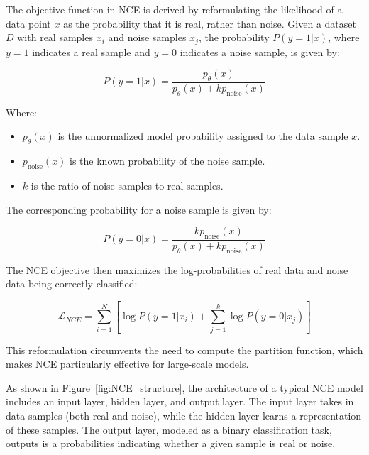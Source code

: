 The objective function in NCE is derived by reformulating the likelihood of a data point \( x \) as the probability that it is real, rather than noise. Given a dataset \( D \) with real samples \( x_i \) and noise samples \( x_j \), the probability \( P(y = 1 | x) \), where \( y = 1 \) indicates a real sample and \( y = 0 \) indicates a noise sample, is given by:

\begin{equation}
P(y = 1 | x) = \frac{p_{\theta}(x)}{p_{\theta}(x) + k p_{\text{noise}}(x)}
\end{equation}

Where:
\begin{itemize}
    \item \( p_{\theta}(x) \) is the unnormalized model probability assigned to the data sample \( x \).
    \item \( p_{\text{noise}}(x) \) is the known probability of the noise sample.
    \item \( k \) is the ratio of noise samples to real samples.
\end{itemize}

The corresponding probability for a noise sample is given by:

\begin{equation}
P(y = 0 | x) = \frac{k p_{\text{noise}}(x)}{p_{\theta}(x) + k p_{\text{noise}}(x)}
\end{equation}

The NCE objective then maximizes the log-probabilities of real data and noise data being correctly classified:

\begin{equation}
\mathcal{L}_{NCE} = \sum_{i=1}^{N} \left[ \log P(y=1 | x_i) + \sum_{j=1}^{k} \log P(y=0 | x_j) \right]
\end{equation}

This reformulation circumvents the need to compute the partition function, which makes NCE particularly effective for large-scale models.

As shown in Figure~\ref{fig:NCE_structure}, the architecture of a typical NCE model includes an input layer, hidden layer, and output layer. The input layer takes in data samples (both real and noise), while the hidden layer learns a representation of these samples. The output layer, modeled as a binary classification task, outputs is a probabilities indicating whether a given sample is real or noise.

